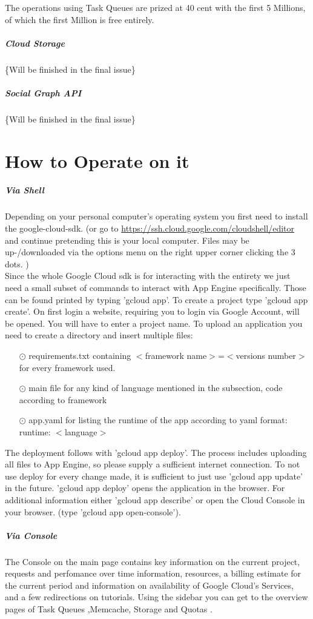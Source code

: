 \documentclass{article}
\begin{document}
The operations using Task Queues are prized at 40 cent with the first 5 Millions, of which the first Million is free entirely.
\subparagraph{Cloud Storage}
\{Will be finished in the final issue\}
\subparagraph{Social Graph API}
\{Will be finished in the final issue\}
\section{How to Operate on it}
\subparagraph{Via Shell}
Depending on your personal computer's operating system you first need to install the google-cloud-sdk. (or go to  \url{https://ssh.cloud.google.com/cloudshell/editor} and continue pretending this is your local computer. Files may be up-/downloaded via the options menu on the right upper corner clicking the 3 dots. ) \\
Since the whole Google Cloud sdk is for interacting with the entirety we just need a small subset of commands to interact with App Engine specifically. Those can be found printed by typing 'gcloud app'.  To create a project type 'gcloud app create'. On first login a website, requiring you to login via Google Account, will be opened. You will have to enter a project name. To upload an application you need to create a directory and insert multiple files: 
\begin{itemize}
\item[$\odot$]  requirements.txt containing  $<$framework name$>$=$<$versions number$>$ for every framework used.
\item[$\odot$] main file for any kind of language mentioned in the subsection, code according to framework
\item[$\odot$] app.yaml for listing the runtime of the app according to yaml format: runtime: $<$language$>$
\end{itemize} 
The deployment follows with 'gcloud app deploy'. The process includes uploading all files to App Engine, so please supply a sufficient internet connection.
To not use deploy for every change made, it is sufficient to just use 'gcloud app update' in the future. 'gcloud app deploy' opens the application in the browser. For additional information either 'gcloud app describe' or open the Cloud Console in your browser. (type 'gcloud app open-console').
\subparagraph{Via Console}
The Console on the main page contains key information on the current project, requests and perfomance over time information, resources, a billing estimate for the current period and information on availability of Google Cloud's Services, and a few redirections on tutorials. Using the sidebar you can get to the overview pages of Task Queues ,Memcache, Storage and Quotas .
\end{document}
